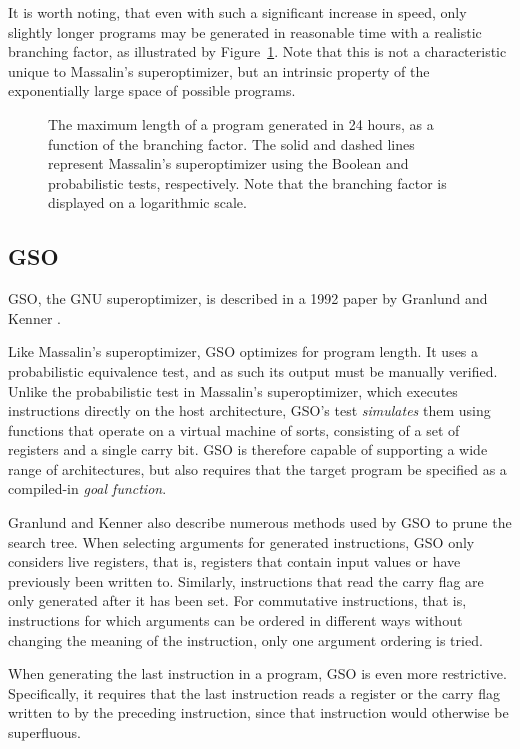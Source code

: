 \documentclass[a4paper,11pt]{kth-mag}
\begin{document}
It is worth noting, that even with such a significant increase in speed, only slightly longer programs may be generated in reasonable time with a realistic branching factor, as illustrated by Figure~\ref{fig:so_program_length}.
Note that this is not a characteristic unique to Massalin's superoptimizer, but an intrinsic property of the exponentially large space of possible programs.

\begin{figure}
\centering

\caption{The maximum length of a program generated in 24 hours, as a function of the branching factor.
The solid and dashed lines represent Massalin's superoptimizer using the Boolean and probabilistic tests, respectively.
Note that the branching factor is displayed on a logarithmic scale.}
\label{fig:so_program_length}
\end{figure}

\subsection{GSO}

GSO, the GNU superoptimizer, is described in a 1992 paper by Granlund and Kenner \cite{granlund92}.

Like Massalin's superoptimizer, GSO optimizes for program length.
It uses a probabilistic equivalence test, and as such its output must be manually verified.
Unlike the probabilistic test in Massalin's superoptimizer, which executes instructions directly on the host architecture, GSO's test \emph{simulates} them using functions that operate on a virtual machine of sorts, consisting of a set of registers and a single carry bit.
GSO is therefore capable of supporting a wide range of architectures, but also requires that the target program be specified as a compiled-in \emph{goal function}.

Granlund and Kenner also describe numerous methods used by GSO to prune the search tree.
When selecting arguments for generated instructions, GSO only considers live registers, that is, registers that contain input values or have previously been written to.
Similarly, instructions that read the carry flag are only generated after it has been set.
For commutative instructions, that is, instructions for which arguments can be ordered in different ways without changing the meaning of the instruction, only one argument ordering is tried.

When generating the last instruction in a program, GSO is even more restrictive.
Specifically, it requires that the last instruction reads a register or the carry flag written to by the preceding instruction, since that instruction would otherwise be superfluous.
\end{document}
